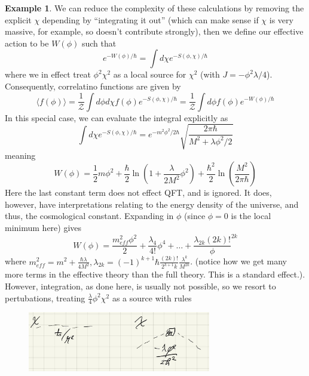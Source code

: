 \documentclass{article}
\theoremstyle{definition}
\newtheorem{example}{Example}
\begin{document}
\begin{example}
  We can reduce the complexity of these calculations by removing the explicit
  $\chi$ depending by ``integrating it out'' (which can make sense if $\chi$ is
  very massive, for example, so doesn't contribute strongly), then we define our
  effective action to be $W(\phi)$ such that
  \begin{equation}
    e^{-W(\phi) / \hbar} = \int d\chi e^{-S(\phi, \chi) / \hbar}
  \end{equation}
  where we in effect treat $\phi^2 \chi^2$ as a local source for $\chi^2$ (with
  $J = - \phi^2 \lambda / 4$). Consequently, correlatino functions are given by
  \begin{equation}
    \langle f(\phi) \rangle
    = \frac{1}{\mathcal{Z}} \int d \phi d \chi f(\phi) e^{-S(\phi, \chi) / \hbar}
    = \frac{1}{\mathcal{Z}} \int d \phi f(\phi) e^{-W(\phi) / \hbar}
  \end{equation}
  In this special case, we can evaluate the integral explicitly as
  \begin{equation}
    \int d\chi e^{-S(\phi, \chi) / \hbar} = e^{-m^2 \phi^2 / 2 \hbar}
    \sqrt{\frac{2 \pi \hbar}{M^2 + \lambda \phi^2 / 2}}
  \end{equation}
  meaning
  \begin{equation}
    W(\phi) = \frac{1}{2} m \phi^2 + \frac{\hbar}{2}
    \ln(1 + \frac{\lambda}{2M^2} \phi^2) + \frac{\hbar^2}{2}
    \ln \left( \frac{M^2}{2 \pi \hbar} \right)
  \end{equation}
  Here the last constant term does not effect QFT, and is ignored. It does,
  however, have interpretations relating to the energy density of the universe,
  and thus, the cosmological constant. Expanding in $\phi$ (since $\phi = 0$ is
  the local minimum here) gives
  \begin{equation}
    W(\phi) = \frac{m_{eff}^2 \phi^2}{2} + \frac{\lambda_4}{4!} \phi^4 + \dots +
    \frac{\lambda_{2k}{(2k)!}} \phi^{2k}
  \end{equation}
  where $m_{eff}^2 = m^2 + \frac{\hbar \lambda}{4M^2}, \lambda_{2k} = (-1)^{k +
    1} \hbar \frac{(2k)!}{2^{k + 1}k} \frac{\lambda^k}{M^{2k}}$. (notice how we
  get many more terms in the effective theory than the full theory. This is a
  standard effect.). However, integration, as done here, is usually not
  possible, so we resort to pertubations, treating $
  \frac{\lambda}{4} \phi^2 \chi^2$ as a source with rules
  \begin{figure}[H]
    \centering
    \includegraphics[width=8cm]{res/AQFT/lec_5_effective_source}

\end{figure}
\end{example}
\end{document}
